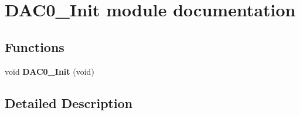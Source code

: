 \hypertarget{group___d_a_c0___init__module}{}\section{D\+A\+C0\+\_\+\+Init module documentation}
\label{group___d_a_c0___init__module}
\subsection*{Functions}
\begin{DoxyCompactItemize}
\item 
void {\bfseries D\+A\+C0\+\_\+\+Init} (void)\hypertarget{group___d_a_c0___init__module_gacee3788f08019ec078973ca642eb2029}{}\label{group___d_a_c0___init__module_gacee3788f08019ec078973ca642eb2029}

\end{DoxyCompactItemize}


\subsection{Detailed Description}
